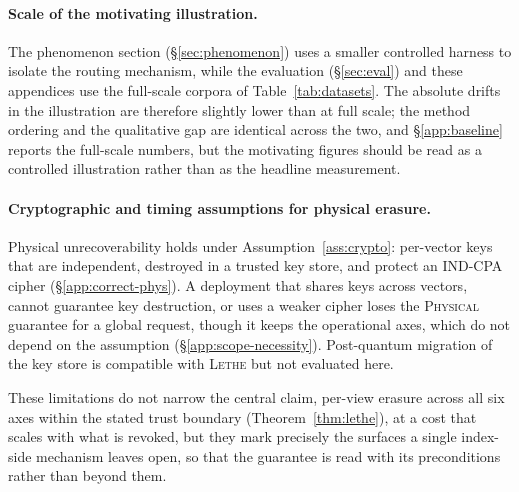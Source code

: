 \documentclass[sigconf, nonacm, review]{acmart}
\begin{document}
\paragraph{Scale of the motivating illustration.}
The phenomenon section (\S\ref{sec:phenomenon}) uses a smaller controlled
harness to isolate the routing mechanism, while the evaluation
(\S\ref{sec:eval}) and these appendices use the full-scale corpora of
Table~\ref{tab:datasets}. The absolute drifts in the illustration are therefore
slightly lower than at full scale; the method ordering and the qualitative gap
are identical across the two, and \S\ref{app:baseline} reports the full-scale
numbers, but the motivating figures should be read as a controlled illustration
rather than as the headline measurement.

\paragraph{Cryptographic and timing assumptions for physical erasure.}
Physical unrecoverability holds under Assumption~\ref{ass:crypto}: per-vector
keys that are independent, destroyed in a trusted key store, and protect an
IND-CPA cipher (\S\ref{app:correct-phys}). A deployment that shares keys across
vectors, cannot guarantee key destruction, or uses a weaker cipher loses the
\textsc{Physical} guarantee for a global request, though it keeps the
operational axes, which do not depend on the assumption
(\S\ref{app:scope-necessity}). Post-quantum migration of the key store is
compatible with \textsc{Lethe} but not evaluated here.

These limitations do not narrow the central claim, per-view erasure across
all six axes within the stated trust boundary (Theorem~\ref{thm:lethe}), at a
cost that scales with what is revoked, but they mark precisely the surfaces a
single index-side mechanism leaves open, so that the guarantee is read with its
preconditions rather than beyond them.

\fi
\end{document}
